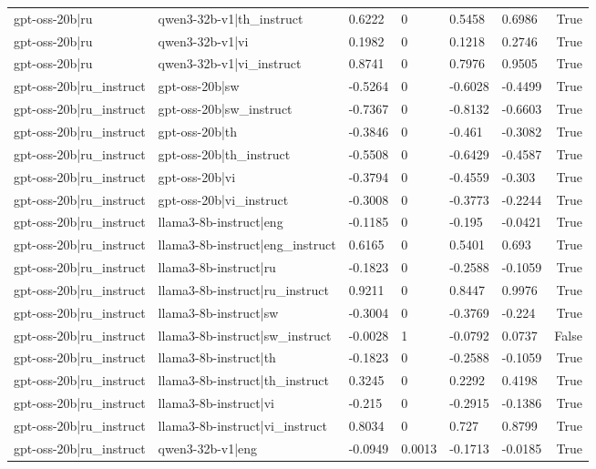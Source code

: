 \begin{table}
\begin{tabular}{llllllr}
gpt-oss-20b|ru & qwen3-32b-v1|th_instruct & 0.6222 & 0 & 0.5458 & 0.6986 & True \\
gpt-oss-20b|ru & qwen3-32b-v1|vi & 0.1982 & 0 & 0.1218 & 0.2746 & True \\
gpt-oss-20b|ru & qwen3-32b-v1|vi_instruct & 0.8741 & 0 & 0.7976 & 0.9505 & True \\
gpt-oss-20b|ru_instruct & gpt-oss-20b|sw & -0.5264 & 0 & -0.6028 & -0.4499 & True \\
gpt-oss-20b|ru_instruct & gpt-oss-20b|sw_instruct & -0.7367 & 0 & -0.8132 & -0.6603 & True \\
gpt-oss-20b|ru_instruct & gpt-oss-20b|th & -0.3846 & 0 & -0.461 & -0.3082 & True \\
gpt-oss-20b|ru_instruct & gpt-oss-20b|th_instruct & -0.5508 & 0 & -0.6429 & -0.4587 & True \\
gpt-oss-20b|ru_instruct & gpt-oss-20b|vi & -0.3794 & 0 & -0.4559 & -0.303 & True \\
gpt-oss-20b|ru_instruct & gpt-oss-20b|vi_instruct & -0.3008 & 0 & -0.3773 & -0.2244 & True \\
gpt-oss-20b|ru_instruct & llama3-8b-instruct|eng & -0.1185 & 0 & -0.195 & -0.0421 & True \\
gpt-oss-20b|ru_instruct & llama3-8b-instruct|eng_instruct & 0.6165 & 0 & 0.5401 & 0.693 & True \\
gpt-oss-20b|ru_instruct & llama3-8b-instruct|ru & -0.1823 & 0 & -0.2588 & -0.1059 & True \\
gpt-oss-20b|ru_instruct & llama3-8b-instruct|ru_instruct & 0.9211 & 0 & 0.8447 & 0.9976 & True \\
gpt-oss-20b|ru_instruct & llama3-8b-instruct|sw & -0.3004 & 0 & -0.3769 & -0.224 & True \\
gpt-oss-20b|ru_instruct & llama3-8b-instruct|sw_instruct & -0.0028 & 1 & -0.0792 & 0.0737 & False \\
gpt-oss-20b|ru_instruct & llama3-8b-instruct|th & -0.1823 & 0 & -0.2588 & -0.1059 & True \\
gpt-oss-20b|ru_instruct & llama3-8b-instruct|th_instruct & 0.3245 & 0 & 0.2292 & 0.4198 & True \\
gpt-oss-20b|ru_instruct & llama3-8b-instruct|vi & -0.215 & 0 & -0.2915 & -0.1386 & True \\
gpt-oss-20b|ru_instruct & llama3-8b-instruct|vi_instruct & 0.8034 & 0 & 0.727 & 0.8799 & True \\
gpt-oss-20b|ru_instruct & qwen3-32b-v1|eng & -0.0949 & 0.0013 & -0.1713 & -0.0185 & True \\

\end{tabular}
\end{table}
